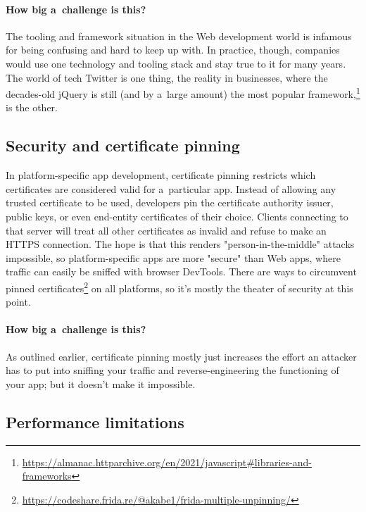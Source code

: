 \documentclass[sigconf]{acmart}
\begin{document}
\paragraph{How big a~challenge is this?}

The tooling and framework situation in the Web development world is infamous for being confusing and hard to keep up with. In practice, though, companies would use one technology and tooling stack and stay true to it for many years. The world of tech Twitter is one thing, the reality in businesses, where the decades-old jQuery is still (and by a~large amount) the most popular framework,\footnote{\url{https://almanac.httparchive.org/en/2021/javascript\#libraries-and-frameworks}} is the other.

\subsection{Security and certificate pinning}

In platform-specific app development, certificate pinning restricts which certificates are considered valid for a~particular app. Instead of allowing any trusted certificate to be used, developers pin the certificate authority issuer, public keys, or even end-entity certificates of their choice. Clients connecting to that server will treat all other certificates as invalid and refuse to make an HTTPS connection. The hope is that this renders "person-in-the-middle" attacks impossible, so platform-specific apps are more "secure" than Web apps, where traffic can easily be sniffed with browser DevTools. There are ways to circumvent pinned certificates\footnote{\url{https://codeshare.frida.re/@akabe1/frida-multiple-unpinning/}} on all platforms, so it's mostly the theater of security at this point.

\paragraph{How big a~challenge is this?}

As outlined earlier, certificate pinning mostly just increases the effort an attacker has to put into sniffing your traffic and reverse-engineering the functioning of your app; but it doesn't make it impossible.

\subsection{Performance limitations}
\end{document}
